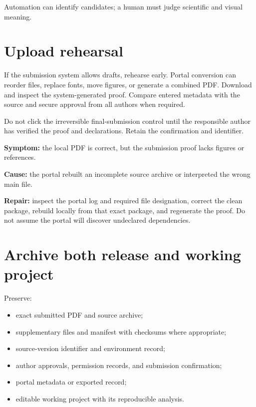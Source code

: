 Automation can identify candidates; a human must judge scientific and visual
meaning.

\section{Upload rehearsal}

If the submission system allows drafts, rehearse early. Portal conversion can
reorder files, replace fonts, move figures, or generate a combined PDF. Download
and inspect the system-generated proof. Compare entered metadata with the source
and secure approval from all authors when required.

Do not click the irreversible final-submission control until the responsible
author has verified the proof and declarations. Retain the confirmation and
identifier.

\begin{commonerror}
\textbf{Symptom:} the local PDF is correct, but the submission proof lacks
figures or references.

\textbf{Cause:} the portal rebuilt an incomplete source archive or interpreted
the wrong main file.

\textbf{Repair:} inspect the portal log and required file designation, correct
the clean package, rebuild locally from that exact package, and regenerate the
proof. Do not assume the portal will discover undeclared dependencies.
\end{commonerror}

\section{Archive both release and working project}

Preserve:

\begin{itemize}
  \item exact submitted PDF and source archive;
  \item supplementary files and manifest with checksums where appropriate;
  \item source-version identifier and environment record;
  \item author approvals, permission records, and submission confirmation;
  \item portal metadata or exported record;
  \item editable working project with its reproducible analysis.
\end{itemize}

